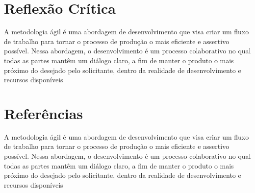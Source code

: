 \documentclass[12pt,a4paper]{article}
\begin{document}
\section*{Reflexão Crítica }

A metodologia ágil é uma abordagem de desenvolvimento que visa criar um fluxo de trabalho para tornar o processo de produção o mais eficiente e assertivo possível. Nessa abordagem, o desenvolvimento é um processo colaborativo no qual todas as partes mantêm um diálogo claro, a fim de manter o produto o mais próximo do desejado pelo solicitante, dentro da realidade de desenvolvimento e recursos disponíveis


\section*{Referências}

A metodologia ágil é uma abordagem de desenvolvimento que visa criar um fluxo de trabalho para tornar o processo de produção o mais eficiente e assertivo possível. Nessa abordagem, o desenvolvimento é um processo colaborativo no qual todas as partes mantêm um diálogo claro, a fim de manter o produto o mais próximo do desejado pelo solicitante, dentro da realidade de desenvolvimento e recursos disponíveis
\end{document}
